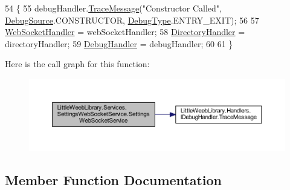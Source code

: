 \begin{DoxyCode}
54         \{
55             debugHandler.\mbox{\hyperlink{interface_little_weeb_library_1_1_handlers_1_1_i_debug_handler_a2e405bc3492e683cd3702fae125221bc}{TraceMessage}}(\textcolor{stringliteral}{"Constructor Called"}, 
      \mbox{\hyperlink{namespace_little_weeb_library_1_1_handlers_a2a6ca0775121c9c503d58aa254d292be}{DebugSource}}.CONSTRUCTOR, \mbox{\hyperlink{namespace_little_weeb_library_1_1_handlers_ab66019ed40462876ec4e61bb3ccb0a62}{DebugType}}.ENTRY\_EXIT);
56 
57             \mbox{\hyperlink{class_little_weeb_library_1_1_handlers_1_1_web_socket_handler}{WebSocketHandler}} = webSocketHandler;
58             \mbox{\hyperlink{class_little_weeb_library_1_1_handlers_1_1_directory_handler}{DirectoryHandler}} = directoryHandler;
59             \mbox{\hyperlink{class_little_weeb_library_1_1_handlers_1_1_debug_handler}{DebugHandler}} = debugHandler;
60 
61         \}
\end{DoxyCode}
Here is the call graph for this function\+:\nopagebreak
\begin{figure}[H]
\begin{center}
\leavevmode
\includegraphics[width=350pt]{class_little_weeb_library_1_1_services_1_1_settings_web_socket_service_aaaa502b8a0362b6852d909887727bddb_cgraph}
\end{center}
\end{figure}


\subsection{Member Function Documentation}
\mbox{\label{class_little_weeb_library_1_1_services_1_1_settings_web_socket_service_af799e00c29f6eec4ca8874cda559c225}} 
